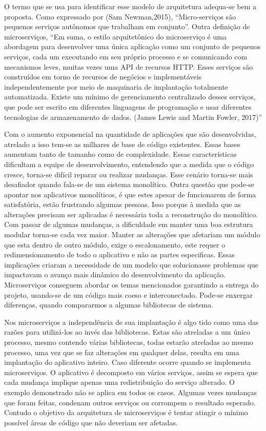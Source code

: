 O termo que se usa para identificar esse modelo de arquitetura adequa-se bem a proposta. Como expressado por (Sam Newman,2015), “Micro-serviços são pequenos serviços autônomos que trabalham em conjunto”. Outra definição de microserviços, “Em suma, o estilo arquitetônico do microserviço é uma abordagem para desenvolver uma única aplicação como um conjunto de pequenos serviços, cada um executando em seu próprio processo e se comunicando com mecanismos leves, muitas vezes uma API de recursos HTTP. Esses serviços são construídos em torno de recursos de negócios e implementáveis independentemente por meio de maquinaria de implantação totalmente automatizada. Existe um mínimo de gerenciamento centralizado desses serviços, que pode ser escrito em diferentes linguagens de programação e usar diferentes tecnologias de armazenamento de dados. (James Lewis and Martin Fowler, 2017)”


Com o aumento exponencial na quantidade de aplicações que são desenvolvidas, atrelado a isso tem-se as milhares de base de código existentes. Essas bases aumentam tanto de tamanho como de complexidade. Essas características dificultam a equipe de desenvolvimento, entendendo que a medida que o código cresce, torna-se difícil reparar ou realizar mudanças. Esse cenário torna-se mais desafiador quando fala-se de um sistema monolítico. Outra questão que pode-se apontar nos aplicativos monolíticos, é que estes apesar de funcionarem de forma satisfatória, estão frustrando algumas pessoas.  Isso porque à medida que as alterações precisam ser aplicadas é necessária toda a reconstrução do monolítico. Com passar de algumas mudanças, a dificuldade em manter uma boa estrutura modular torna-se cada vez maior. Manter as alterações que  afetariam um módulo que esta dentro de outro módulo, exige o escalonamento, este requer o redimensionamento de todo o aplicativo e não as partes especificas. Essas implicações criaram a necessidade de um modelo que solucionasse problemas que impactavam o avanço mais dinâmico do desenvolvimento da aplicação.
Microserviços conseguem abordar os temas mencionados garantindo a entrega do projeto, usando-se de um código mais coeso e interconectado.  Pode-se enxergar diferenças, quando compararmos a algumas bibliotecas de sistema.


Nos microserviços a independência de sua implantação é algo tido como uma das razões para utilizá-los ao invés das bibliotecas. Estas são atreladas a um único processo, mesmo contendo várias bibliotecas, todas estarão atreladas ao mesmo processo, uma vez que se faz alterações em qualquer delas, resulta em uma implantação do aplicativo inteiro. Caso diferente ocorre quando se implementa microserviços. O aplicativo é decomposto em vários serviços, assim se espera que cada mudança implique apenas uma redistribuição do serviço alterado. O exemplo demonstrado não se aplica em todos os casos. Algumas vezes mudanças que foram feitas, condenam outros serviços ou corrompem o resultado esperado. Contudo o objetivo da arquitetura de microserviços é tentar atingir o mínimo possível áreas de código que não deveriam ser afetadas.


